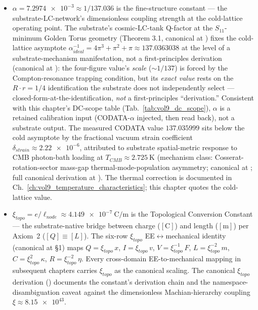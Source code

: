 \begin{itemize}
    \item $\alpha = \num{7.2974e-3} \approx 1/137.036$ is the fine-structure constant --- the substrate-LC-network's dimensionless coupling strength at the cold-lattice operating point. The substrate's cosmic-LC-tank Q-factor at the $S_{11}$-minimum Golden Torus geometry (Theorem 3.1, canonical at ) fixes the cold-lattice asymptote $\alpha^{-1}_{ideal} = 4\pi^3 + \pi^2 + \pi \approx 137.0363038$ at the level of a substrate-mechanism manifestation, not a first-principles derivation (canonical at ): the four-figure value's \emph{scale} ($\sim 1/137$) is forced by the Compton-resonance trapping condition, but its \emph{exact value} rests on the $R\cdot r = 1/4$ identification the substrate does not independently select --- closed-form-at-the-identification, \emph{not} a first-principles ``derivation.'' Consistent with this chapter's DC-scope table (Tab.~\ref{tab:vol9_dc_scope}), $\alpha$ is a retained calibration input (CODATA-$\alpha$ injected, then read back), not a substrate output. The measured CODATA value $137.035999$ sits below the cold asymptote by the fractional vacuum strain coefficient $\delta_{strain} \approx \num{2.22e-6}$, attributed to substrate spatial-metric response to CMB photon-bath loading at $T_{CMB} \approx \qty{2.725}{\kelvin}$ (mechanism class: Cosserat-rotation-sector mass-gap thermal-mode-population asymmetry; canonical at ; full canonical derivation at ). The thermal correction is documented in Ch.~\ref{ch:vol9_temperature_characteristics}; this chapter quotes the cold-lattice value.
    \item $\xi_{topo} = e/\ell_{node} \approx \qty{4.149e-7}{\coulomb\per\metre}$ is the Topological Conversion Constant --- the substrate-native bridge between charge ($[\text{C}]$) and length ($[\text{m}]$) per Axiom~2 ($[Q] \equiv [L]$). The six-row $\xi_{topo}$ EE$\leftrightarrow$mechanical identity (canonical at  \S 1) maps $Q = \xi_{topo}\,x$, $I = \xi_{topo}\,v$, $V = \xi_{topo}^{-1}\,F$, $L = \xi_{topo}^{-2}\,m$, $C = \xi_{topo}^{2}\,\kappa$, $R = \xi_{topo}^{-2}\,\eta$. Every cross-domain EE-to-mechanical mapping in subsequent chapters carries $\xi_{topo}$ as the canonical scaling. The canonical $\xi_{topo}$ derivation () documents the constant's derivation chain and the namespace-disambiguation caveat against the dimensionless Machian-hierarchy coupling $\xi \approx \num{8.15e43}$.
\end{itemize}

